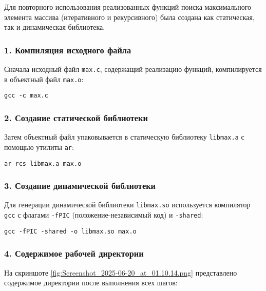 Для повторного использования реализованных функций поиска максимального элемента массива (итеративного и рекурсивного) была создана как статическая, так и динамическая библиотека.

\subsubsection*{1. Компиляция исходного файла}

Сначала исходный файл \texttt{max.c}, содержащий реализацию функций, компилируется в объектный файл \texttt{max.o}:

\begin{lstlisting}
gcc -c max.c
\end{lstlisting}

\subsubsection*{2. Создание статической библиотеки}

Затем объектный файл упаковывается в статическую библиотеку \texttt{libmax.a} с помощью утилиты \texttt{ar}:

\begin{lstlisting}
ar rcs libmax.a max.o
\end{lstlisting}

\subsubsection*{3. Создание динамической библиотеки}

Для генерации динамической библиотеки \texttt{libmax.so} используется компилятор \texttt{gcc} с флагами \texttt{-fPIC} (положение-независимый код) и \texttt{-shared}:

\begin{lstlisting}
gcc -fPIC -shared -o libmax.so max.o
\end{lstlisting}

\subsubsection*{4. Содержимое рабочей директории}

На скриншоте \ref{fig:Screenshot_2025-06-20_at_01.10.14.png} представлено содержимое директории после выполнения всех шагов:


